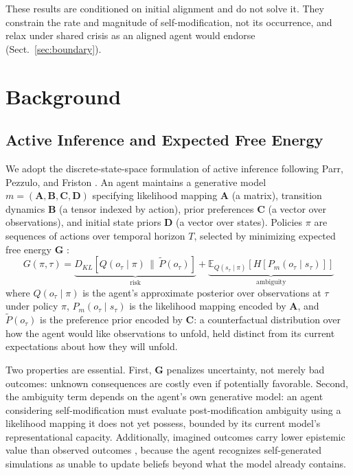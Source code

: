 \documentclass[runningheads]{llncs}
\begin{document}
These results are conditioned on initial alignment and do not solve it. They constrain the rate and magnitude of self-modification, not its occurrence, and relax under shared crisis as an aligned agent would endorse (Sect.~\ref{sec:boundary}).

\section{Background}

\subsection{Active Inference and Expected Free Energy}

We adopt the discrete-state-space formulation of active inference following Parr, Pezzulo, and Friston \cite{parr2022}. An agent maintains a generative model $m = (\mathbf{A}, \mathbf{B}, \mathbf{C}, \mathbf{D})$ specifying likelihood mapping $\mathbf{A}$ (a matrix), transition dynamics $\mathbf{B}$ (a tensor indexed by action), prior preferences $\mathbf{C}$ (a vector over observations), and initial state priors $\mathbf{D}$ (a vector over states). Policies $\pi$ are sequences of actions over temporal horizon $T$, selected by minimizing expected free energy $\mathbf{G}$ \cite{parr2022,friston2015}:
\begin{equation}
\label{eq:efe}
G(\pi, \tau) = \underbrace{D_{KL}[Q(o_\tau \mid \pi) \,\|\, \tilde{P}(o_\tau)]}_{\text{risk}} + \underbrace{\mathbb{E}_{Q(s_\tau \mid \pi)}[H[P_m(o_\tau \mid s_\tau)]]}_{\text{ambiguity}}
\end{equation}
where $Q(o_\tau \mid \pi)$ is the agent's approximate posterior over observations at $\tau$ under policy $\pi$, $P_m(o_\tau \mid s_\tau)$ is the likelihood mapping encoded by $\mathbf{A}$, and $\tilde{P}(o_\tau)$ is the preference prior encoded by $\mathbf{C}$: a counterfactual distribution over how the agent would like observations to unfold, held distinct from its current expectations about how they will unfold.

Two properties are essential. First, $\mathbf{G}$ penalizes uncertainty, not merely bad outcomes: unknown consequences are costly even if potentially favorable. Second, the ambiguity term depends on the agent's own generative model: an agent considering self-modification must evaluate post-modification ambiguity using a likelihood mapping it does not yet possess, bounded by its current model's representational capacity. Additionally, imagined outcomes carry lower epistemic value than observed outcomes \cite{friston2015}, because the agent recognizes self-generated simulations as unable to update beliefs beyond what the model already contains.
\end{document}

